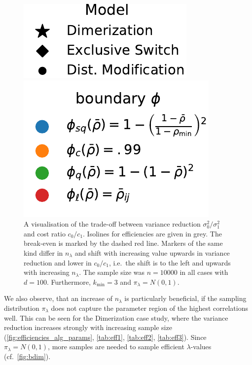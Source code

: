 \begin{figure}[tb]
  \hfill
  \begin{minipage}{.4\textwidth}
    \vfill
    \includegraphics[scale=.5]{gfx/legend_models.pdf}
    \vfill
  \end{minipage}
  \begin{minipage}{.4\textwidth}
    \vfill
    \includegraphics[scale=.5]{gfx/legend_phi.pdf}
    \vfill
  \end{minipage}
  \hfill
  \caption[Cost \& variance reduction trade-off]{A visualisation of
    the trade-off between variance reduction $\sigma_0^2/\sigma_1^2$
    and cost ratio $c_0/c_1$. Isolines for efficiencies are given in
    grey. The break-even
    is marked by the dashed red line.
    Markers of the same kind differ in $n_{\lambda}$ and shift with
    increasing value
    upwards in variance reduction and lower in $c_0/c_1$, i.e.\ the
    shift is to the left and upwards
    with increasing $n_{\lambda}$.
    The sample size was $n=\num{10000}$ in all cases
  with $d=100$. Furthermore, $k_{\min}=3$ and $\pi_\lambda=N(0,1)$.}
  \label{fig:trade_off}
\end{figure}

We also observe, that an increase of $n_{\lambda}$ is particularly
beneficial, if
the sampling distribution $\pi_{\lambda}$ does not capture the
parameter region of
the highest correlations well.
This can be seen for the Dimerization case study, where the variance
reduction increases
strongly with increasing sample size
(\autoref{fig:efficiencies_alg_params}, \autoref{tab:eff1},
\autoref{tab:eff2}, \autoref{tab:eff3}).
Since $\pi_{\lambda}=N(0,1)$, more samples are needed to sample
efficient $\lambda$-values (cf.\ \autoref{fig:bdim}).

